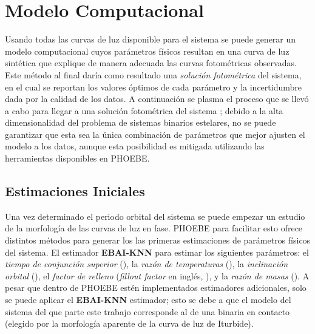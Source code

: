 \chapter{Modelo Computacional} \label{metodologia:modelocomputacional}

Usando todas las curvas de luz disponible para el sistema \atoObjId se puede
generar un modelo computacional cuyos parámetros físicos resultan en una curva
de luz sintética que explique de manera adecuada las curvas fotométricas
observadas. Este método al final daría como resultado una \textit{solución
fotométrica} del sistema, en el cual se reportan los valores óptimos de cada
parámetro y la incertidumbre dada por la calidad de los datos. A continuación se
plasma el proceso que se llevó a cabo para llegar a una solución fotométrica del
sistema \atoObjIdNoSpace; debido a la alta dimensionalidad del problema de
sistemas binarios estelares, no se puede garantizar que esta sea la única
combinación de parámetros que mejor ajusten el modelo a los datos, aunque esta
posibilidad es mitigada utilizando las herramientas disponibles en PHOEBE.

\section{Estimaciones Iniciales}
\label{metodologia:modelocomputacional:estimacionesiniciales}

Una vez determinado el periodo orbital del sistema se puede empezar un estudio
de la morfología de las curvas de luz en fase. PHOEBE para facilitar esto ofrece
distintos métodos para generar los las primeras estimaciones de parámetros
físicos del sistema. El estimador \textbf{EBAI-KNN} para estimar los siguientes
parámetros: el \textit{tiempo de conjunción superior} (), la
\textit{razón de temperaturas} (), la \textit{inclinación
	orbital} (), el \textit{factor de relleno}
(\textit{fillout factor} en inglés, ), y la
\textit{razón de masas} (). A pesar que dentro de PHOEBE estén
implementados estimadores adicionales, solo se puede aplicar el
\textbf{EBAI-KNN} estimador; esto se debe a que el modelo del sistema del que
parte este trabajo corresponde al de una binaria en contacto (elegido por la
morfología aparente de la curva de luz de Iturbide).


